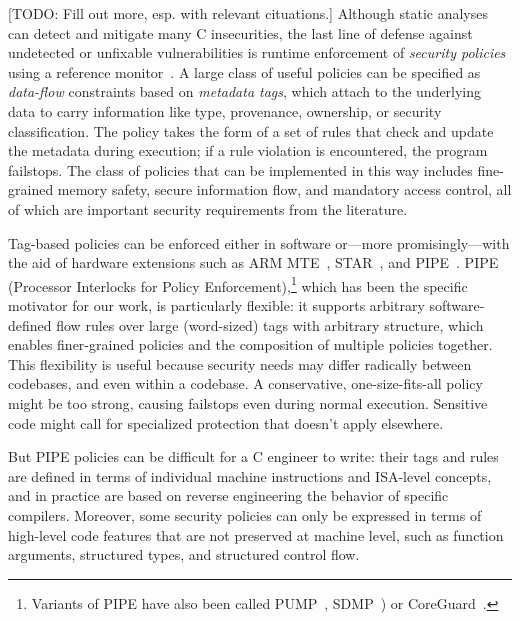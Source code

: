 \documentclass{llncs}
\begin{document}
[TODO: Fill out more, esp. with relevant cituations.] Although static
analyses can detect and mitigate many C insecurities, the last line of
defense against undetected or unfixable vulnerabilities is runtime
enforcement of {\em security policies} using a reference
monitor~\cite{Anderson72:PlanningStudy}. A large class of useful policies
can be specified as \emph{data-flow} constraints based on \emph{metadata tags},
which attach to the underlying data to carry information like type, provenance,
ownership, or security classification. The policy takes the form of a set of
rules that check and update the metadata during execution; if a rule violation is
encountered, the program failstops. The class of policies that can be implemented
in this way includes fine-grained memory safety, secure information flow,
and mandatory access control, all of which are important security requirements
from the literature.

Tag-based policies can be enforced either in software or---more promisingly---with the
aid of hardware extensions such as ARM MTE~\cite{arm-mte},
STAR~\cite{Gollapudi+23}, and
PIPE~\cite{Dhawan+15,Azevedo+16,Azevedo+15}.  PIPE (Processor
Interlocks for Policy Enforcement),\footnote{ Variants of PIPE have
also been called PUMP~\cite{Dhawan+14,Dhawan+15},
SDMP~\cite{Dover16,RoesslerD18}) or CoreGuard~\cite{Dover20}.}
which has been the specific motivator for our work, is particularly flexible: it supports
arbitrary software-defined flow rules over large (word-sized) tags with arbitrary structure,
which enables finer-grained policies and the composition of multiple policies together.
This flexibility is useful because security needs may differ radically between codebases,
and even within a codebase. A conservative, one-size-fits-all policy might be too strong,
causing failstops even during normal execution. Sensitive code might call for specialized
protection that doesn't apply elsewhere.


But PIPE policies can be difficult for a C engineer to write: their tags and rules
are defined in terms of individual machine instructions and ISA-level
concepts, and in practice are based on reverse engineering the behavior
of specific compilers. 
Moreover, some security policies can only be expressed in terms of high-level code
features that are not preserved at machine level, such as function
arguments, structured types, and structured control flow.
\end{document}
